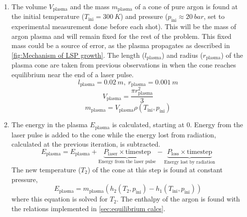         \begin{enumerate}
            \item The volume $V_\mathrm{plasma}$ and the mass $m_\mathrm{plasma}$ of a cone of pure argon is found at the initial temperature ($T_\mathrm{ini} = \qty{300}{K}$) and pressure ($p_\mathrm{ini} \approx \qty{20}{bar}$, set to experimental measurement done before each shot). This will be the mass of argon plasma and will remain fixed for the rest of the problem. This fixed mass could be a source of error, as the plasma propagates as described in \autoref{fig:Mechanism of LSP growth}. The length ($l_\mathrm{plasma}$) and radius ($r_\mathrm{plasma}$) of the plasma cone are taken from previous observations in \textcite{duplayArgonLaserPlasmaThruster2024a} when the cone reaches equilibrium near the end of a laser pulse.
                \begin{equation}
                    l_\mathrm{plasma} = \qty{0.02}{m}, \: r_\mathrm{plasma} = \qty{0.001}{m}
                \end{equation}
                \begin{equation}
                    V_\mathrm{plasma} = \frac{\pi r_\mathrm{plasma}^2}{3}
                \end{equation}
                \begin{equation}
                    m_\mathrm{plasma} = V_\mathrm{plasma}\rho(T_\mathrm{ini}, p_\mathrm{ini})
                \end{equation}
            \item The energy in the plasma $E_\mathrm{plasma}$ is calculated, starting at 0. Energy from the laser pulse is added to the cone while the energy lost from radiation, calculated at the previous iteration, is subtracted.
                \begin{equation}
                    E_\mathrm{plasma} = E_\mathrm{plasma} + \underbrace{P_\mathrm{laser} \times \mathrm{timestep}}_\textrm{Energy from the laser pulse} - \underbrace{P_\mathrm{loss} \times \mathrm{timestep}}_\textrm{Energy lost by radiation}
                \end{equation}
                The new temperature ($T_2$) of the cone at this step is found at constant pressure,
                \begin{equation}
                    E_\mathrm{plasma} = m_\mathrm{plasma} \left(h_2 (T_2, p_\mathrm{ini}) - h_1(T_\mathrm{ini}, p_\mathrm{ini})\right)
                \end{equation}
                where this equation is solved for $T_2$. The enthalpy of the argon is found with the relations implemented in \autoref{sec:equilibrium calcs}.

\end{enumerate}

